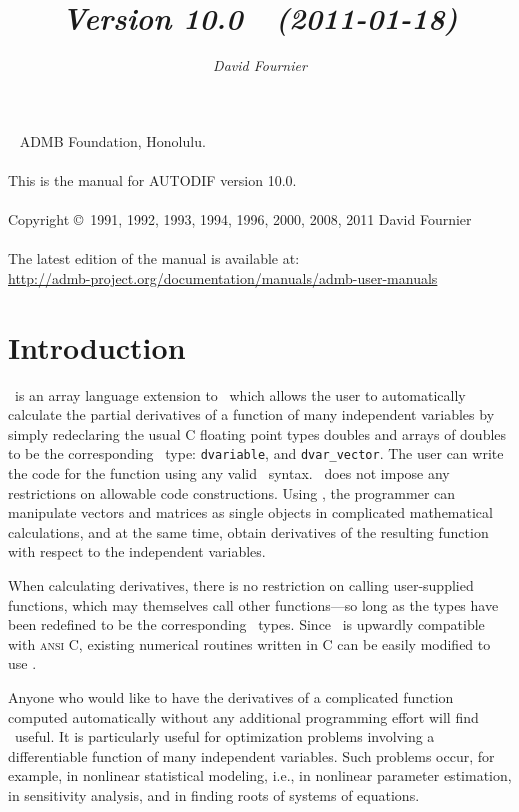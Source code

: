 \documentclass{admbmanual}
\title{%
  \largetitlepart{AUTODIF}
  \smalltitlepart{%
    A \cplus\ Array Language Extension\\
    with Automatic Differentiation\\
    for Use in Nonlinear Modeling and Statistics}
  \vspace{4ex}\textsf{\textit{Version 10.0~~(2011-01-18)}}\vspace{3ex}
}
\author{\textsf{\textit{David Fournier}}}
\newcommand{\question}[1]{\bigskip\noindent{\bf #1?}\par\medskip\noindent}
\begin{document}
\maketitle

~\vfill
\noindent ADMB Foundation, Honolulu.\\\\
\noindent This is the manual for AUTODIF version 10.0.\\\\
\noindent Copyright \copyright\ 1991, 1992, 1993, 1994, 1996, 2000, 2008, 2011
David Fournier\\\\
\noindent The latest edition of the manual is available at:\\
\url{http://admb-project.org/documentation/manuals/admb-user-manuals}

\tableofcontents

\chapter{Introduction}
\label{ch:introduction}

\question{What is \scAD}
\scAD\ is an array language extension to \cplus\ which allows the user to
automatically calculate the partial derivatives of a function of many
independent variables by simply redeclaring the usual C floating point types
doubles and arrays of doubles to be the corresponding \scAD\ type:
\texttt{dvariable}, and \texttt{dvar\_vector}. The user can write the code for
the function using any valid \cplus\ syntax. \scAD\ does not impose any
restrictions on allowable code constructions. Using \scAD, the programmer can
manipulate vectors and matrices as single objects in complicated mathematical
calculations, and at the same time, obtain derivatives of the resulting function
with respect to the independent variables.

When calculating derivatives, there is no restriction on calling user-supplied
functions, which may themselves call other functions---so long as the types have
been redefined to be the corresponding \scAD\ types. Since \cplus\ is upwardly
compatible with \textsc{ansi C}, existing numerical routines written in C can be
easily modified to use \scAD.

\question{Who should use \scAD}
Anyone who would like to have the derivatives of a complicated function computed
automatically without any additional programming effort will find \scAD\ useful.
It is particularly useful for optimization problems involving a differentiable
function of many independent variables. Such problems occur, for example, in
nonlinear statistical modeling, i.e., in nonlinear parameter estimation, in
sensitivity analysis, and in finding roots of systems of equations.
\end{document}

